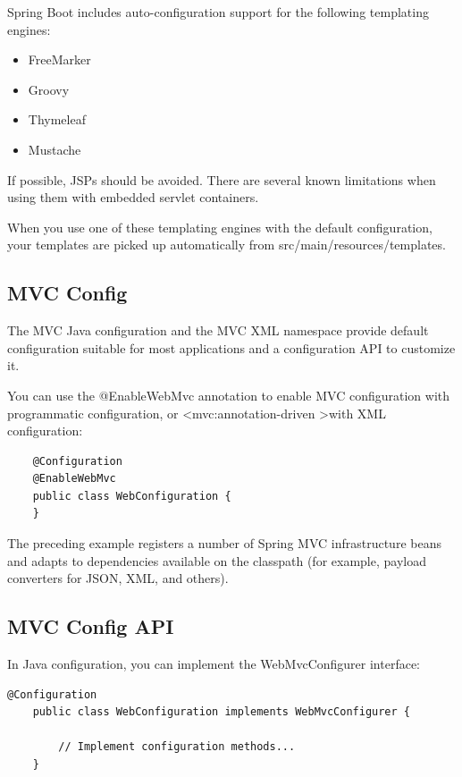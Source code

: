 \documentclass{scrartcl}
\begin{document}
Spring Boot includes auto-configuration support for the following templating engines:

\begin{itemize}
    \item FreeMarker
    \item Groovy
    \item Thymeleaf
    \item Mustache
\end{itemize}

If possible, JSPs should be avoided. There are several known limitations when using them with embedded servlet containers.

When you use one of these templating engines with the default configuration, your templates are picked up automatically from src/main/resources/templates.

\subsection{MVC Config}

The MVC Java configuration and the MVC XML namespace provide default configuration suitable for most applications and a configuration API to customize it.

You can use the @EnableWebMvc annotation to enable MVC configuration with programmatic configuration, or \textless mvc:annotation-driven \textgreater  with XML configuration:

\begin{lstlisting}
    @Configuration
    @EnableWebMvc
    public class WebConfiguration {
    }
\end{lstlisting}

The preceding example registers a number of Spring MVC infrastructure beans and adapts to dependencies available on the classpath (for example, payload converters for JSON, XML, and others).

\subsection{MVC Config API}

In Java configuration, you can implement the WebMvcConfigurer interface:

\begin{lstlisting}@Configuration
    public class WebConfiguration implements WebMvcConfigurer {

        // Implement configuration methods...
    }
\end{lstlisting}
\end{document}
